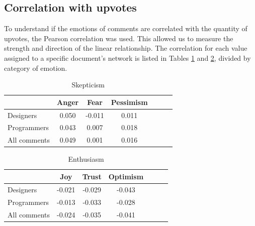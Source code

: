 \documentclass[conference]{IEEEtran}
\begin{document}
\subsection{Correlation with upvotes}
To understand if the emotions of comments are correlated with the quantity of upvotes, the Pearson correlation was used. This allowed us to measure the strength and direction of the linear relationship. The correlation for each value assigned to a specific document's network is listed in Tables \ref{tab:skep_corr} and \ref{tab:enth_corr}, divided by category of emotion.
\begin{table}[H]
    \centering
    \caption{Skepticism}
    \label{tab:skep_corr}
    \begin{tabular}{l c c c c c c}
        \hline
        & Anger & Fear & Pessimism \\
        \hline
        Designers & 0.050 & -0.011 & 0.011 \\
        Programmers & 0.043 & 0.007 & 0.018 \\
        All comments & 0.049 & 0.001 & 0.016 \\
        \hline
    \end{tabular}
\end{table}
\begin{table}[H]
    \centering
    \caption{Enthusiasm}
    \label{tab:enth_corr}
    \begin{tabular}{l c c c c c c}
        \hline
        & Joy & Trust & Optimism \\
        \hline
        Designers & -0.021 & -0.029 & -0.043 \\
        Programmers & -0.013 & -0.033 & -0.028 \\
        All comments & -0.024 & -0.035 & -0.041 \\
        \hline
    \end{tabular}
\end{table}
\end{document}
